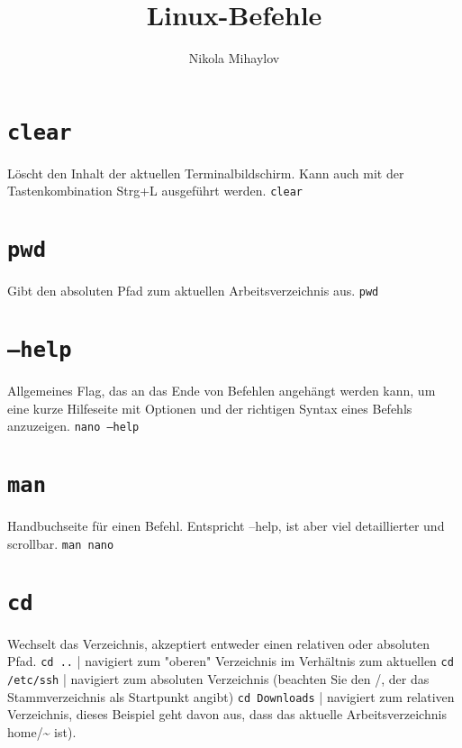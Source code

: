 \documentclass{article}
\title{Linux-Befehle}
\author{Nikola Mihaylov}
\newcommand{\doublebreak}{\break\break}
\begin{document}
	\RaggedRight
	
	\maketitle
	
	\newpage
	
	\tableofcontents
	
	\newpage
	
	\section{\texttt{clear}}
	Löscht den Inhalt der aktuellen Terminalbildschirm. Kann auch mit der Tastenkombination Strg+L ausgeführt werden.
	\doublebreak
	\texttt{clear}
	
	\section{\texttt{pwd}}
	Gibt den absoluten Pfad zum aktuellen Arbeitsverzeichnis aus.
	\doublebreak
	\texttt{pwd}
	
    \section{\texttt{--help}}
	Allgemeines Flag, das an das Ende von Befehlen angehängt werden kann, um eine kurze Hilfeseite mit Optionen und der richtigen Syntax eines Befehls anzuzeigen.
	\doublebreak
	\texttt{nano --help}
	
	\section{\texttt{man}}
	Handbuchseite für einen Befehl. Entspricht --help, ist aber viel detaillierter und scrollbar.
	\doublebreak
	\texttt{man nano}
	
	\section{\texttt{cd}}
	Wechselt das Verzeichnis, akzeptiert entweder einen relativen oder absoluten Pfad.
	\doublebreak
	\texttt{cd ..} | navigiert zum "oberen" Verzeichnis im Verhältnis zum aktuellen
	\doublebreak
	\texttt{cd /etc/ssh} | navigiert zum absoluten Verzeichnis (beachten Sie den /, der das Stammverzeichnis als Startpunkt angibt)
	\doublebreak
	\texttt{cd Downloads} | navigiert zum relativen Verzeichnis, dieses Beispiel geht davon aus, dass das aktuelle Arbeitsverzeichnis home/\textasciitilde{} ist).
\end{document}
